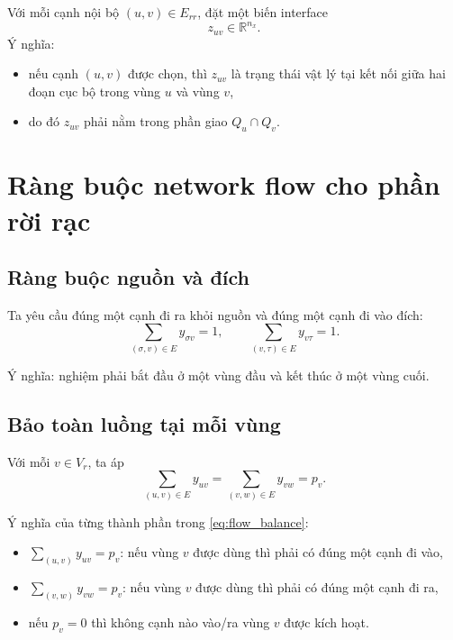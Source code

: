 \documentclass[12pt]{article}
\begin{document}
Với mỗi cạnh nội bộ $(u,v)\in E_{rr}$, đặt một biến interface
\begin{equation}
z_{uv}\in\mathbb R^{n_x}.
\label{eq:zdef}
\end{equation}
Ý nghĩa:
\begin{itemize}
    \item nếu cạnh $(u,v)$ được chọn, thì $z_{uv}$ là trạng thái vật lý tại kết nối giữa hai đoạn cục bộ trong vùng $u$ và vùng $v$,
    \item do đó $z_{uv}$ phải nằm trong phần giao $Q_u\cap Q_v$.
\end{itemize}

\section{Ràng buộc network flow cho phần rời rạc}

\subsection{Ràng buộc nguồn và đích}

Ta yêu cầu đúng một cạnh đi ra khỏi nguồn và đúng một cạnh đi vào đích:
\begin{equation}
\sum_{(\sigma,v)\in E} y_{\sigma v}=1,
\qquad
\sum_{(v,\tau)\in E} y_{v\tau}=1.
\label{eq:source_sink_flow}
\end{equation}

Ý nghĩa: nghiệm phải bắt đầu ở một vùng đầu và kết thúc ở một vùng cuối.

\subsection{Bảo toàn luồng tại mỗi vùng}

Với mỗi $v\in V_r$, ta áp
\begin{equation}
\sum_{(u,v)\in E} y_{uv}
=
\sum_{(v,w)\in E} y_{vw}
=
p_v.
\label{eq:flow_balance}
\end{equation}

Ý nghĩa của từng thành phần trong \eqref{eq:flow_balance}:
\begin{itemize}
    \item $\sum_{(u,v)} y_{uv}=p_v$: nếu vùng $v$ được dùng thì phải có đúng một cạnh đi vào,
    \item $\sum_{(v,w)} y_{vw}=p_v$: nếu vùng $v$ được dùng thì phải có đúng một cạnh đi ra,
    \item nếu $p_v=0$ thì không cạnh nào vào/ra vùng $v$ được kích hoạt.
\end{itemize}
\end{document}
